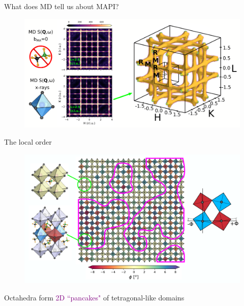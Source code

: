 \documentclass[12pt]{beamer}
\begin{document}

\begin{frame}{What does MD tell us about MAPI?}

\begin{figure}
    \includegraphics[scale=0.275]{figs/xds.png}
\end{figure}

\end{frame}


\begin{frame}{The local order}

\begin{figure}
    \includegraphics[width=1.0\linewidth]{figs/local_order_4.png}
\end{figure}

Octahedra form \textcolor{purple}{2D ``pancakes"} of tetragonal-like domains

\end{frame}
\end{document}
